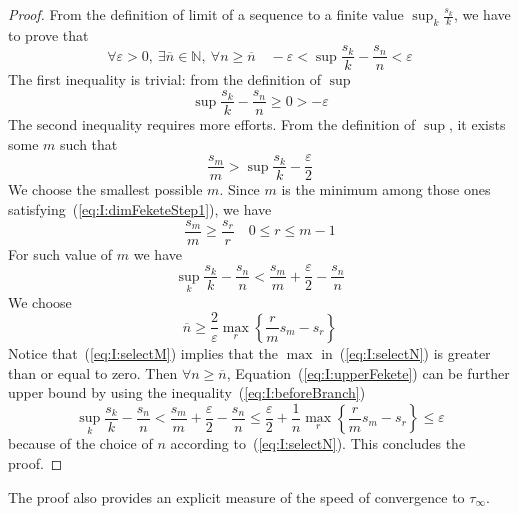 \documentclass[12pt,draftcls,onecolumn]{IEEEtran} %
\newcommand{\NN}{\mathbb{N}}
\begin{document}
\begin{proof}
  From the definition of limit of a sequence to a finite value
  $\sup_k\frac{s_k}k$, we have to prove that
  \begin{equation*}
    \forall \varepsilon>0,\ \exists \overline{n}\in\NN,
    \ \forall n\geq\overline{n}
    \quad
    -\varepsilon <\sup\frac{s_k}k-\frac{s_n}{n} < \varepsilon
  \end{equation*}
  The first inequality is trivial: from the definition of $\sup$
  \begin{equation*}
    \sup\frac{s_k}k-\frac{s_n}{n} \geq 0 > -\varepsilon
  \end{equation*}
  The second inequality requires more efforts.  From the definition of
  $\sup$, it exists some $m$ such that
  \begin{equation}
    \frac{s_m}m > \sup\frac{s_k}k -\frac{\varepsilon}2
    \label{eq:I:dimFeketeStep1}
  \end{equation}
  We choose the smallest possible $m$. Since $m$ is the minimum among
  those ones satisfying~(\ref{eq:I:dimFeketeStep1}), we have
  \begin{equation}
    \label{eq:I:selectM}
    \frac{s_m}m \geq \frac{s_r}r \quad 0\leq r\leq m-1
  \end{equation}
  For such value of $m$ we have
  \begin{equation}
    \sup_k\frac{s_k}k-\frac{s_n}{n} <
    \frac{s_m}m+\frac{\varepsilon}2-\frac{s_n}{n}
    \label{eq:I:upperFekete}
  \end{equation}
  We choose
  \begin{equation}
    \label{eq:I:selectN}
    \overline{n} \geq \frac 2\varepsilon \max_r\left\{\frac r m s_m-s_r\right\}
  \end{equation}
  Notice that~(\ref{eq:I:selectM}) implies that the $\max$
  in~(\ref{eq:I:selectN}) is greater than or equal to zero.  Then
  $\forall n\geq \overline{n}$, Equation~(\ref{eq:I:upperFekete}) can
  be further upper bound by using the inequality~(\ref{eq:I:beforeBranch})
  \begin{equation*}
    \sup_k\frac{s_k}k-\frac{s_n}{n} <
    \frac{s_m}m+\frac{\varepsilon}2-\frac{s_n}{n}
    \leq \frac{\varepsilon}2 +\frac 1 n\max_r\left\{\frac r m s_m-s_r\right\} 
    \leq
    \varepsilon
  \end{equation*}
  because of the choice of $n$ according to~(\ref{eq:I:selectN}). This
  concludes the proof.
\end{proof}
The proof also provides an explicit measure of the speed of
convergence to $\tau_\infty$.
\end{document}

